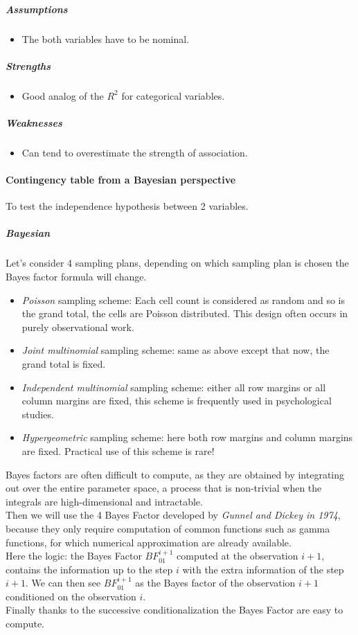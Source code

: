 \subparagraph{Assumptions}
\begin{itemize}
    \item The both variables have to be nominal.
\end{itemize}

\subparagraph{Strengths}
\begin{itemize}
    \item Good analog of the $R^{2}$ for categorical variables.
\end{itemize}

\subparagraph{Weaknesses}
\begin{itemize}
    \item Can tend to overestimate the strength of association.
\end{itemize}



\paragraph{Contingency table from a Bayesian perspective}
To test the independence hypothesis between 2 variables.
\subparagraph{Bayesian}
Let's consider 4 sampling plans, depending on which sampling plan is chosen the Bayes
factor formula will change.
\begin{itemize}
    \item \emph{Poisson} sampling scheme: Each cell count is considered as random and so
        is the grand total, the cells are Poisson distributed. This design often occurs
        in purely observational work.
    \item \emph{Joint multinomial} sampling scheme: same as above except that now, the 
        grand total is fixed. 
    \item \emph{Independent multinomial} sampling scheme: either all row margins or all 
        column margins are fixed, this scheme is frequently used in psychological studies.
    \item \emph{Hypergeometric} sampling scheme: here both row margins and column margins are fixed. Practical use of this scheme is rare!  
\end{itemize}
Bayes factors are often difficult to compute, as they are obtained by integrating out over
the entire parameter space, a process that is non-trivial when the integrals are 
high-dimensional and intractable. \\
Then we will use the 4 Bayes Factor developed by \emph{Gunnel and Dickey in 1974}, because
they only require computation of common functions such as gamma functions, for which 
numerical approximation are already available.\\
Here the logic: the Bayes Factor $BF^{i+1}_{01}$ computed at the observation $i+1$, 
contains the information up to the step $i$ with the extra information of the step $i+1$. 
We can then see $BF^{i+1}_{01}$ as the Bayes factor of the observation $i+1$ conditioned
on the observation $i$.\\
Finally thanks to the successive conditionalization the Bayes Factor are easy to compute.

